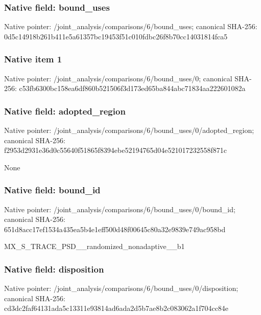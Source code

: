 \documentclass[10pt,a4paper]{article}
\begin{document}
\subsubsection{Native field: bound\_\allowbreak{}uses}
Native pointer: /joint\_\allowbreak{}analysis/comparisons/6/bound\_\allowbreak{}uses; canonical SHA-256: 0d5c14918b261b411e5a61357bc19453f51c010fdbc26f8b70cc14031814fca5

\subsubsection{Native item 1}
Native pointer: /joint\_\allowbreak{}analysis/comparisons/6/bound\_\allowbreak{}uses/0; canonical SHA-256: c53fb6300bc158ea6df860b521506f3d173ed65ba844abc71834aa222601082a

\subsubsection{Native field: adopted\_\allowbreak{}region}
Native pointer: /joint\_\allowbreak{}analysis/comparisons/6/bound\_\allowbreak{}uses/0/adopted\_\allowbreak{}region; canonical SHA-256: f2953d2931e36d0c55640f51865f8394ebe52194765d04e521017232558f871c

\begingroup\raggedright\sloppy None\par\endgroup

\subsubsection{Native field: bound\_\allowbreak{}id}
Native pointer: /joint\_\allowbreak{}analysis/comparisons/6/bound\_\allowbreak{}uses/0/bound\_\allowbreak{}id; canonical SHA-256: 651d8acc17ef1534a435ea5b4e1eff500d48f00645c80a32e9839e749ac958bd

\begingroup\raggedright\sloppy MX\_\allowbreak{}S\_\allowbreak{}TRACE\_\allowbreak{}PSD\_\allowbreak{}\_\allowbreak{}randomized\_\allowbreak{}nonadaptive\_\allowbreak{}\_\allowbreak{}b1\par\endgroup

\subsubsection{Native field: disposition}
Native pointer: /joint\_\allowbreak{}analysis/comparisons/6/bound\_\allowbreak{}uses/0/disposition; canonical SHA-256: cd3dc2faf64131ada5c13311e93814ad6ada2d5b7ae8b2c083062a1f704cc84e
\end{document}

